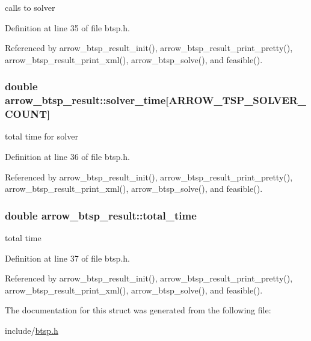 calls to solver 

Definition at line 35 of file btsp.h.

Referenced by arrow\_\-btsp\_\-result\_\-init(), arrow\_\-btsp\_\-result\_\-print\_\-pretty(), arrow\_\-btsp\_\-result\_\-print\_\-xml(), arrow\_\-btsp\_\-solve(), and feasible().\hypertarget{structarrow__btsp__result_f13227603570821a0ba7d6466f39f00c}{
\subsubsection{\setlength{\rightskip}{0pt plus 5cm}double {\bf arrow\_\-btsp\_\-result::solver\_\-time}\mbox{[}ARROW\_\-TSP\_\-SOLVER\_\-COUNT\mbox{]}}}
\label{structarrow__btsp__result_f13227603570821a0ba7d6466f39f00c}


total time for solver 

Definition at line 36 of file btsp.h.

Referenced by arrow\_\-btsp\_\-result\_\-init(), arrow\_\-btsp\_\-result\_\-print\_\-pretty(), arrow\_\-btsp\_\-result\_\-print\_\-xml(), arrow\_\-btsp\_\-solve(), and feasible().\hypertarget{structarrow__btsp__result_dea5711f0a574d98f66d1b20011a68de}{
\subsubsection{\setlength{\rightskip}{0pt plus 5cm}double {\bf arrow\_\-btsp\_\-result::total\_\-time}}}
\label{structarrow__btsp__result_dea5711f0a574d98f66d1b20011a68de}


total time 

Definition at line 37 of file btsp.h.

Referenced by arrow\_\-btsp\_\-result\_\-init(), arrow\_\-btsp\_\-result\_\-print\_\-pretty(), arrow\_\-btsp\_\-result\_\-print\_\-xml(), arrow\_\-btsp\_\-solve(), and feasible().

The documentation for this struct was generated from the following file:\begin{CompactItemize}
\item 
include/\hyperlink{btsp_8h}{btsp.h}\end{CompactItemize}

